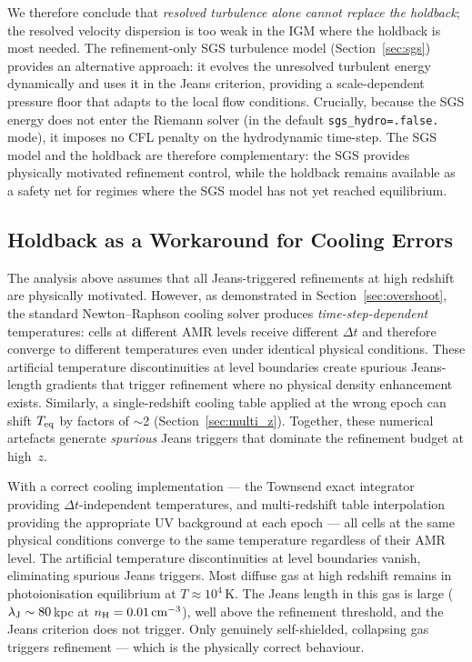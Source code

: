 \documentclass[fleqn,usenatbib]{mnras}
\newcommand{\lJ}{\lambda_{\rm J}}
\newcommand{\code}[1]{\texttt{#1}}
\begin{document}
We therefore conclude that \emph{resolved turbulence alone cannot
replace the holdback}; the resolved velocity dispersion is too
weak in the IGM where the holdback is most needed.  The
refinement-only SGS turbulence model (Section~\ref{sec:sgs})
provides an alternative approach: it evolves the unresolved turbulent
energy dynamically and uses it in the Jeans criterion, providing
a scale-dependent pressure floor that adapts to the local flow
conditions.  Crucially, because the SGS energy does not enter
the Riemann solver (in the default \code{sgs\_hydro=.false.}
mode), it imposes no CFL penalty on the hydrodynamic time-step.
The SGS model and the holdback are therefore
complementary: the SGS provides physically motivated refinement
control, while the holdback remains available as a safety
net for regimes where the SGS model has not yet reached
equilibrium.

\subsection{Holdback as a Workaround for Cooling Errors}
\label{sec:holdback_cooling}

The analysis above assumes that all Jeans-triggered refinements at
high redshift are physically motivated.  However, as demonstrated
in Section~\ref{sec:overshoot}, the standard Newton--Raphson
cooling solver produces \emph{time-step-dependent} temperatures:
cells at different AMR levels receive different $\Delta t$ and
therefore converge to different temperatures even under identical
physical conditions.  These artificial temperature discontinuities
at level boundaries create spurious Jeans-length gradients that
trigger refinement where no physical density enhancement exists.
Similarly, a single-redshift cooling table applied at the wrong
epoch can shift $T_{\rm eq}$ by factors of $\sim$2
(Section~\ref{sec:multi_z}).  Together, these numerical artefacts
generate \emph{spurious} Jeans triggers that dominate the
refinement budget at high~$z$.

With a correct cooling implementation --- the Townsend exact
integrator providing $\Delta t$-independent temperatures, and
multi-redshift table interpolation providing the appropriate UV
background at each epoch --- all cells at the same physical
conditions converge to the same temperature regardless of their
AMR level.  The artificial temperature discontinuities at level
boundaries vanish, eliminating spurious Jeans triggers.  Most
diffuse gas at high redshift remains in photoionisation equilibrium
at $T \approx 10^4$\,K.  The Jeans length in this gas is large
($\lJ \sim 80$\,kpc at $n_{\rm H} = 0.01\,{\rm cm}^{-3}$), well
above the refinement threshold, and the Jeans criterion does not
trigger.  Only genuinely self-shielded, collapsing gas triggers
refinement --- which is the physically correct behaviour.
\end{document}
